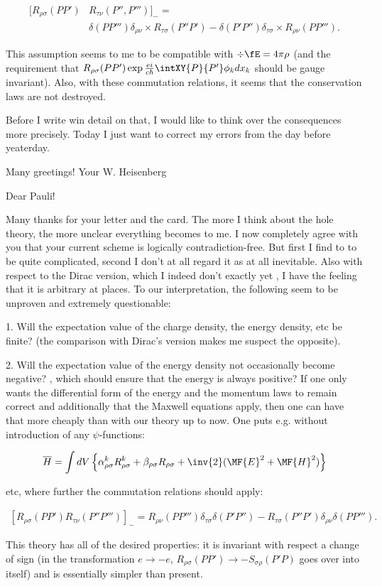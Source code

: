 \documentclass{article}
\newcommand{\nc}[2]{
  \newcommand{#1}{#2}
}
\newcommand{\rc}[2]{
  \renewcommand{#1}{#2}
}
\newcommand{\uequ}[1]{
\begin{align*}
#1
\end{align*}
}
\begin{document}
\uequ{
[R_{\rho\sigma}(PP')&R_{\tau\nu}(P'',P''')]_{-} = \\
&\delta(P P''')\delta_{\rho\nu}\times R_{\tau\sigma}(P'' P') -
\delta(P' P'')\delta_{\tau\sigma}\times R_{\rho\nu}(P P''').
}
This assumption seems to me to be compatible with $\div\fE = 4\pi\rho$ (and the requirement that $R_{\rho\sigma}(PP')\exp{\frac{ei}{c\hbar}}\intXY{P}{P'}\phi_k{dx_k}$ should be gauge invariant). Also, with these commutation relations, it seems that the conservation laws are not destroyed.

Before I write win detail on that, I would like to think over the consequences more precisely. Today I just want to correct my errors from the day before yeaterday.

Many greetings!
Your W. Heisenberg

\date{January 29, 1934}

Dear Pauli!

Many thanks for your letter and the card. The more I think about the hole theory, the more unclear everything becomes to me. I now completely agree with you that your current scheme is logically contradiction-free. But first I find to to be quite complicated, second I don't at all regard it as at all inevitable. Also with respect to the Dirac version, which I indeed don't exactly yet , I have the feeling that it is arbitrary at places. To our interpretation, the following seem to be unproven and extremely questionable:

1. Will the expectation value of the charge density, the energy density, etc be finite? (the comparison with Dirac's version makes me suspect the opposite).

2. Will the expectation value of the energy density not occasionally become negative? , which should ensure that the energy is always positive?
If one only wants the differential form of the energy and the momentum laws to remain correct and additionally that the Maxwell equations apply, then one can have that more cheaply than with our theory up to now. One puts e.g. without introduction of any $\psi$-functions:

\rc{\fE}{\MF{E}}
\nc{\fH}{\MF{H}}

\uequ{
\overline{H} = \int {dV}\left\{
\alpha^k_{\rho\sigma} R^k_{\rho\sigma} +
\beta_{\rho\sigma}R_{\rho\sigma} +
\inv{2}(\fE^2 + \fH^2)
\right\}
}
etc, where further the commutation relations should apply:
\uequ{
[R_{\rho\sigma}(PP')R_{\tau\nu}(P''P''')]_{-}
 = R_{\rho\nu}(PP''')\delta_{\tau\sigma}\delta(P'P'') -
   R_{\tau\sigma}(P''P')\delta_{\rho\nu}\delta(PP''').
}
This theory has all of the desired properties: it is invariant with respect a change of sign (in the transformation $e \to -e$, $R_{\rho\sigma}(PP') \to -S_{\sigma\rho}(P'P)$ goes over into itself) and is essentially simpler than present.
\end{document}
